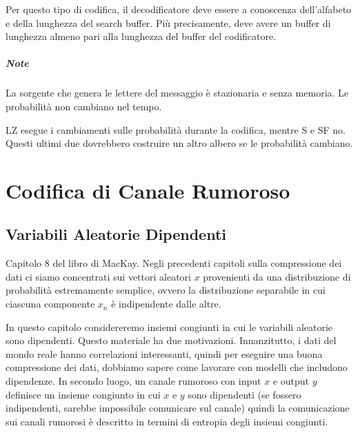 Per questo tipo di codifica, il decodificatore deve essere a conoscenza dell'alfabeto e della lunghezza del search buffer. Più precisamente, deve avere un buffer di lunghezza almeno pari alla lunghezza del buffer del codificatore.

\paragraph{Note} La sorgente che genera le lettere del messaggio è stazionaria e senza memoria. Le probabilità non cambiano nel tempo. 

LZ esegue i cambiamenti sulle probabilità durante la codifica, mentre S e SF no. Questi ultimi due dovrebbero costruire un altro albero se le probabilità cambiano.




\chapter{Codifica di Canale Rumoroso}

\section{Variabili Aleatorie Dipendenti}
Capitolo 8 del libro di MacKay. Negli precedenti capitoli sulla compressione dei dati ci siamo concentrati sui vettori aleatori $x$ provenienti da una distribuzione di probabilità estremamente semplice, ovvero la distribuzione separabile in cui ciascuna componente $x_n$ è indipendente dalle altre.

In questo capitolo considereremo insiemi congiunti in cui le variabili aleatorie sono dipendenti. Questo materiale ha due motivazioni. Innanzitutto, i dati del mondo reale hanno correlazioni interessanti, quindi per eseguire una buona compressione dei dati, dobbiamo sapere come lavorare con modelli che includono dipendenze. In secondo luogo, un canale rumoroso con input $x$ e output $y$ definisce un insieme congiunto in cui $x$ e $y$ sono dipendenti (se fossero indipendenti, sarebbe impossibile comunicare sul canale) quindi la comunicazione sui canali rumorosi è descritto in termini di entropia degli insiemi congiunti.

